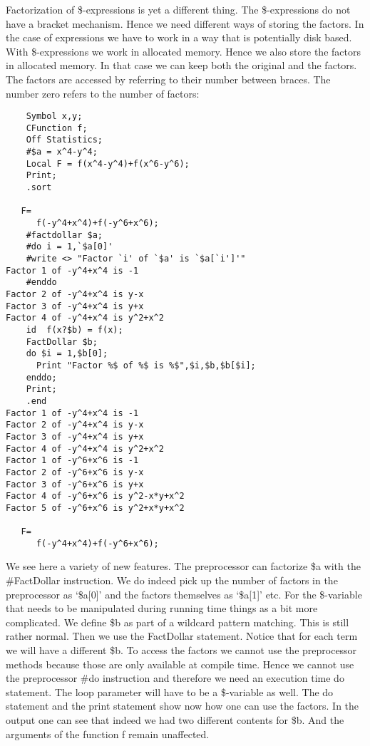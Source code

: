 \noindent Factorization of \$-expressions is yet a different thing. The 
\$-expressions do not have a bracket mechanism. Hence we need different 
ways of storing the factors. In the case of expressions we have to work in 
a way that is potentially disk based. With \$-expressions we work in 
allocated memory. Hence we also store the factors in allocated memory. In 
that case we can keep both the original and the factors. The factors are 
accessed by referring to their number between braces. The number zero 
refers to the number of factors:
\begin{verbatim}
    Symbol x,y;
    CFunction f;
    Off Statistics;
    #$a = x^4-y^4;
    Local F = f(x^4-y^4)+f(x^6-y^6);
    Print;
    .sort

   F=
      f(-y^4+x^4)+f(-y^6+x^6);
    #factdollar $a;
    #do i = 1,`$a[0]'
    #write <> "Factor `i' of `$a' is `$a[`i']'"
Factor 1 of -y^4+x^4 is -1
    #enddo
Factor 2 of -y^4+x^4 is y-x
Factor 3 of -y^4+x^4 is y+x
Factor 4 of -y^4+x^4 is y^2+x^2
    id  f(x?$b) = f(x);
    FactDollar $b;
    do $i = 1,$b[0];
      Print "Factor %$ of %$ is %$",$i,$b,$b[$i];
    enddo;
    Print;
    .end
Factor 1 of -y^4+x^4 is -1
Factor 2 of -y^4+x^4 is y-x
Factor 3 of -y^4+x^4 is y+x
Factor 4 of -y^4+x^4 is y^2+x^2
Factor 1 of -y^6+x^6 is -1
Factor 2 of -y^6+x^6 is y-x
Factor 3 of -y^6+x^6 is y+x
Factor 4 of -y^6+x^6 is y^2-x*y+x^2
Factor 5 of -y^6+x^6 is y^2+x*y+x^2

   F=
      f(-y^4+x^4)+f(-y^6+x^6);
\end{verbatim}
\noindent We see here a variety of new features. The preprocessor can 
factorize \$a with the \#FactDollar instruction. We do indeed pick up the 
number of factors in the preprocessor as `\$a[0]' and the factors 
themselves as `\$a[1]' etc. For the \$-variable that needs to be 
manipulated during running time things as a bit more complicated. We define 
\$b as part of a wildcard pattern matching. This is still rather normal. 
Then we use the FactDollar statement. Notice that for each term we will 
have a different \$b. To access the factors we cannot use the preprocessor 
methods because those are only available at compile time. Hence we cannot 
use the preprocessor \#do instruction and therefore we need an execution 
time do statement. The loop parameter will have to be a \$-variable as 
well. The do statement and the print statement show now how one can use the 
factors. In the output one can see that indeed we had two different 
contents for \$b. And the arguments of the function f remain unaffected.

